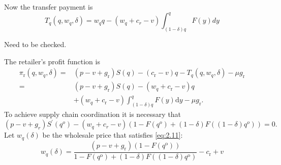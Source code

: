 Now the transfer payment is 
\begin{equation*}
    T_q(q,w_q,\delta)=w_q q-(w_q+c_r-v)\int_{(1-\delta)q}^q F(y)dy
\end{equation*}
\begin{note}
    Need to be checked.
\end{note}
The retailer's profit function is 
$$\begin{aligned}
    \pi_{\mathrm{r}}\left(q, w_{q}, \delta\right)=&\left(p-v+g_{\mathrm{r}}\right) S(q)-\left(c_{\mathrm{r}}-v\right) q-T_{q}\left(q, w_{q}, \delta\right)-\mu g_{\mathrm{r}} \\
    =&\left(p-v+g_{\mathrm{r}}\right) S(q)-\left(w_{q}+c_{\mathrm{r}}-v\right) q \\
    &+\left(w_{q}+c_{\mathrm{r}}-v\right) \int_{(1-\delta) q}^{q} F(y) \mathrm{d} y-\mu g_{\mathrm{r}}.
\end{aligned}$$
To achieve supply chain coordination it is necessary that
\begin{equation}\label{eq:2.11}
    (p-v+g_r)S^\prime(q^o)-(w_q+c_r-v)\left(1-F(q^o)+(1-\delta)F((1-\delta)q^o)\right)=0.
\end{equation}
Let $w_{q}(\delta)$ be the wholesale price that satisfies \autoref{eq:2.11}:
$$
w_{q}(\delta)=\frac{\left(p-v+g_{\mathrm{r}}\right)\left(1-F\left(q^{\mathrm{o}}\right)\right)}{1-F\left(q^{\mathrm{o}}\right)+(1-\delta) F\left((1-\delta) q^{\mathrm{o}}\right)}-c_{\mathrm{r}}+v
$$
